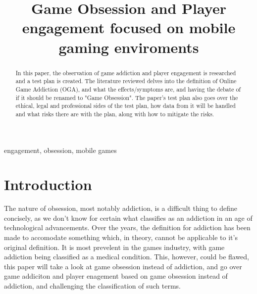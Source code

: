 \documentclass[conference]{IEEEtran}
\begin{document}
\title{Game Obsession and Player engagement focused on mobile gaming enviroments\\
}

\author{
}

\maketitle



\begin{abstract}
 In this paper, the observation of game addiction and player engagement is researched and a test plan is created. The literature reviewed delves into the definition of Online Game Addiction (OGA), and what the effects/symptoms are, and having the debate of if it should be renamed to "Game Obsession". The paper's test plan also goes over the ethical, legal and professional sides of the test plan, how data from it will be handled and what risks there are with the plan, along with how to mitigate the risks.
\end{abstract}

\begin{IEEEkeywords}
engagement, obsession, mobile games
\end{IEEEkeywords}

\section{Introduction}
The nature of obsession, most notably addiction, is a difficult thing to define concisely, as we don't know for certain what classifies as an addiction in an age of technological advancements. Over the years, the definition for addiction has been made to accomodate something which, in theory, cannot be applicable to it's original definition. It is most prevelent in the games industry, with game addiction being classified as a medical condition. This, however, could be flawed, this paper will take a look at game obsession instead of addiction, and go over game addiciton and player enagement based on game obsession instead of addiction, and challenging the classification of such terms.\\
\end{document}
